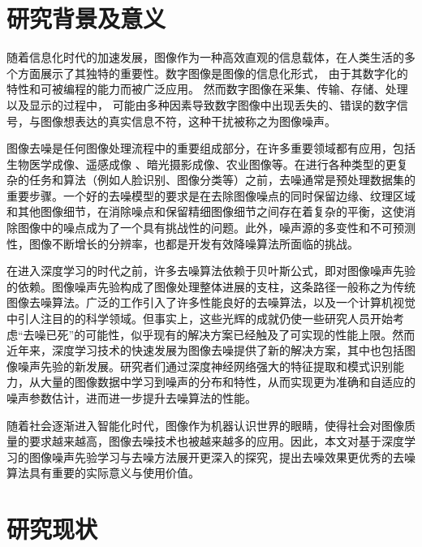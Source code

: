 \section{研究背景及意义}

随着信息化时代的加速发展，图像作为一种高效直观的信息载体，在人类生活的多个方面展示了其独特的重要性。数字图像是图像的信息化形式， 由于其数字化的特性和可被编程的能力而被广泛应用。 然而数字图像在采集、传输、存储、处理以及显示的过程中， 可能由多种因素导致数字图像中出现丢失的、错误的数字信号，与图像想表达的真实信息不符，这种干扰被称之为图像噪声。

图像去噪是任何图像处理流程中的重要组成部分，在许多重要领域都有应用，包括生物医学成像\cite{ctdenoise, eformer}、遥感成像 \cite{hybridhsidenoise, cnnhsidenoise}、暗光摄影成像\cite{eld}、农业图像\cite{鸡儿denoise, 杂交denoise}等。在进行各种类型的更复杂的任务和算法（例如人脸识别\cite{qualnet}、图像分类\cite{ddp, sfdunet}等）之前，去噪通常是预处理数据集的重要步骤。一个好的去噪模型的要求是在去除图像噪点的同时保留边缘、纹理区域和其他图像细节，在消除噪点和保留精细图像细节之间存在着复杂的平衡，这使消除图像中的噪点成为了一个具有挑战性的问题。此外，噪声源的多变性和不可预测性，图像不断增长的分辨率，也都是开发有效降噪算法所面临的挑战。

在进入深度学习的时代之前，许多去噪算法依赖于贝叶斯公式，即对图像噪声先验的依赖。图像噪声先验构成了图像处理整体进展的支柱，这条路径一般称之为传统图像去噪算法。广泛的工作引入了许多性能良好的去噪算法，以及一个计算机视觉中引人注目的的科学领域。但事实上，这些光辉的成就仍使一些研究人员开始考虑“去噪已死”的可能性\cite{去噪已死}，似乎现有的解决方案已经触及了可实现的性能上限。然而近年来，深度学习技术的快速发展为图像去噪提供了新的解决方案，其中也包括图像噪声先验的新发展。研究者们通过深度神经网络强大的特征提取和模式识别能力，从大量的图像数据中学习到噪声的分布和特性，从而实现更为准确和自适应的噪声参数估计，进而进一步提升去噪算法的性能。


随着社会逐渐进入智能化时代，图像作为机器认识世界的眼睛，使得社会对图像质量的要求越来越高，图像去噪技术也被越来越多的应用。因此，本文对基于深度学习的图像噪声先验学习与去噪方法展开更深入的探究，提出去噪效果更优秀的去噪算法具有重要的实际意义与使用价值。

\section{研究现状}


